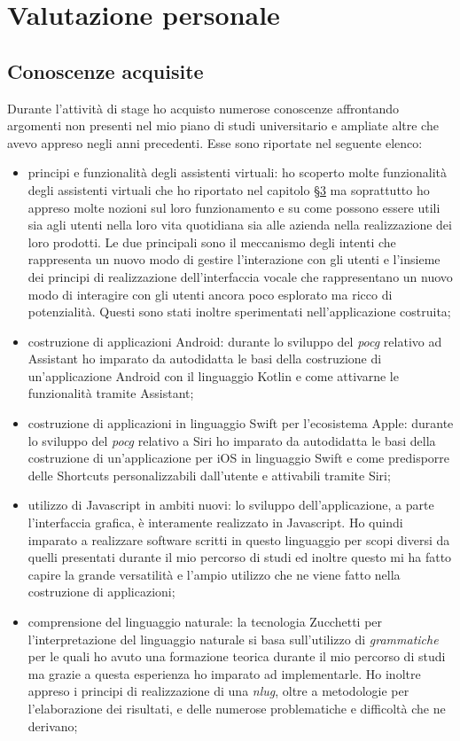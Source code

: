 \section{Valutazione personale}
\subsection{Conoscenze acquisite}
Durante l'attività di stage ho acquisto numerose conoscenze affrontando argomenti non presenti nel mio piano di studi universitario e ampliate altre che avevo appreso negli anni precedenti. Esse sono riportate nel seguente elenco:
\begin{itemize}
	\item principi e funzionalità degli assistenti virtuali: ho scoperto molte funzionalità degli assistenti virtuali che ho riportato nel capitolo  §\hyperref[cap:descrizione-stage]{3} ma soprattutto ho appreso molte nozioni sul loro funzionamento e su come possono essere utili sia agli utenti nella loro vita quotidiana sia alle azienda nella realizzazione dei loro prodotti. Le due principali sono il meccanismo degli intenti che rappresenta un nuovo modo di gestire l'interazione con gli utenti e l'insieme dei principi di realizzazione dell'interfaccia vocale che rappresentano un nuovo modo di interagire con gli utenti ancora poco esplorato ma ricco di potenzialità. Questi sono stati inoltre sperimentati nell'applicazione costruita;
	\item costruzione di applicazioni Android: durante lo sviluppo del \emph{\gls{pocg}} relativo ad Assistant ho imparato da autodidatta le basi della costruzione di un'applicazione Android con il linguaggio Kotlin e come attivarne le funzionalità tramite Assistant;
	\item costruzione di applicazioni in linguaggio Swift per l'ecosistema Apple: durante lo sviluppo del \emph{\gls{pocg}} relativo a Siri ho imparato da autodidatta le basi della costruzione di un'applicazione per iOS in linguaggio Swift e come predisporre delle Shortcuts personalizzabili dall'utente e attivabili tramite Siri;
	\item utilizzo di Javascript in ambiti nuovi: lo sviluppo dell'applicazione, a parte l'interfaccia grafica, è interamente realizzato in Javascript. Ho quindi imparato a realizzare software scritti in questo linguaggio per scopi diversi da quelli presentati durante il mio percorso di studi ed inoltre questo mi ha fatto capire la grande versatilità e l'ampio utilizzo che ne viene fatto nella costruzione di applicazioni;
	\item comprensione del linguaggio naturale: la tecnologia Zucchetti per l'interpretazione del linguaggio naturale si basa sull'utilizzo di \emph{grammatiche} per le quali ho avuto una formazione teorica durante il mio percorso di studi ma grazie a questa esperienza ho imparato ad implementarle. Ho inoltre appreso i principi di realizzazione di una \emph{\gls{nlug}}, oltre a metodologie per l'elaborazione dei risultati, e delle numerose problematiche e difficoltà che ne derivano;

\end{itemize}
